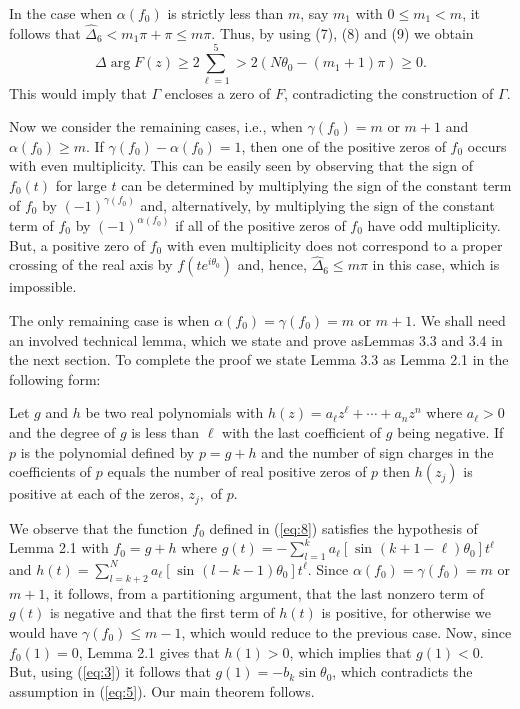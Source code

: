 In the case when $\alpha(f_0)$ is strictly less than $m$, say $m_1$
with $0\leq m_1 <m$, it follows that $\hat{\Delta}_6 <m_1\pi +\pi
\leq m\pi$.  Thus, by using (7), (8) and (9) we obtain
$$\Delta\arg F(z)\geq 2\sum^5_{\ell=1}>2(N\theta_0-(m_1+1)\pi)\geq
0.$$  This would imply that $\Gamma$ encloses a zero of $F$,
contradicting the construction of $\Gamma$.

Now we consider the remaining cases, i.e., when $\gamma(f_0)=m$ or
$m+1$ and $\alpha(f_0) \geq m$.  If $\gamma(f_0)-\alpha (f_0)=1$,
then one of  the positive zeros of $f_0$ occurs with even
multiplicity.  This can be easily seen by observing that the sign of
$f_0(t)$ for large $t$ can be determined by  multiplying the sign of
the constant term of $f_0$ by $(-1)^{\gamma(f_0)}$ and, alternatively,
by multiplying the sign of the constant term of $f_0$ by
$(-1)^{\alpha(f_0)}$ if all of the positive zeros of $f_0$ have odd
multiplicity.  But, a positive zero of $f_0$ with even multiplicity
does not correspond to a proper crossing of the real axis by
$f(te^{i\theta_0})$ and, hence, $\hat{\Delta}_6\leq m\pi$ in this
case, which is impossible.

The only remaining case is when $\alpha(f_0) = \gamma(f_0)=m$ or
$m+1$.   We shall need an involved technical lemma, which we state and prove asLemmas 3.3 and 3.4 in the next section. To complete the proof we
state Lemma 3.3 as Lemma 2.1 in the following form:

\begin{lemma}  Let $g$ and $h$ be two real polynomials with $h(z) =
a_{\ell} z^{\ell} + \cdots + a_{n} z^{n} $ where $a_{\ell} > 0$ and
the degree of $g$ is less than $\ell$ with the last coefficient of
$g$ being negative.  If $p$ is the polynomial defined by $p = g + h$
and the number of sign charges in the coefficients of $p$ equals
the number of real positive zeros of $p$ then $h (z_{j})$ is positive
at each of the zeros, $z_{j},$ of $p$.

\end{lemma}

 We observe that the function $f_0$ defined in (\ref{eq:8}) satisfies
the hypothesis of Lemma 2.1 with $f_0 = g + h$ where $g(t) = -
\displaystyle{\sum^{k}_{l=1}} a_{\ell} \left[ \mbox{ sin } (k + 1 -
\ell ) \theta_{0} \right] t^{\ell}$ and $h(t) =
\displaystyle{\sum^{N}_{l = k+2}} a_{\ell} \left[\mbox{ sin } ( l -
 k- 1 ) \theta_{0} \right] t^{\ell}.$  Since $\alpha (f_0) = \gamma
(f_0)=m$ or $m+1$, it  follows, from a partitioning argument, that
the last nonzero term of $g(t)$ is negative and that the first term
of $h(t)$ is positive, for otherwise we would have $\gamma(f_0)\leq
m-1$, which would reduce to the previous case.  Now, since
$f_0(1)=0$, Lemma 2.1 gives that $h(1) > 0$, which
implies that $g(1) < 0$.  But, using (\ref{eq:3}) it follows that
$g(1) = -b_k \sin \theta_0$, which contradicts the assumption in
(\ref{eq:5}).  Our main theorem follows.

